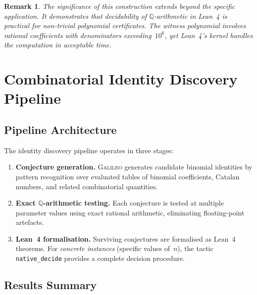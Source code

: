 \documentclass[11pt,a4paper]{article}
\newtheorem{remark}[theorem]{Remark}
\begin{document}
\begin{remark}
The significance of this construction extends beyond the specific application.
It demonstrates that \emph{decidability of $\mathbb{Q}$-arithmetic in Lean~4}
is practical for non-trivial polynomial certificates. The witness polynomial
involves rational coefficients with denominators exceeding~$10^{6}$, yet
Lean~4's kernel handles the computation in acceptable time.
\end{remark}

\section{Combinatorial Identity Discovery Pipeline}\label{sec:identities}

\subsection{Pipeline Architecture}

The identity discovery pipeline operates in three stages:
\begin{enumerate}
  \item \textbf{Conjecture generation.} \textsc{Galileo} generates candidate
    binomial identities by pattern recognition over evaluated tables of
    binomial coefficients, Catalan numbers, and related combinatorial
    quantities.
  \item \textbf{Exact $\mathbb{Q}$-arithmetic testing.} Each conjecture is
    tested at multiple parameter values using exact rational arithmetic,
    eliminating floating-point artefacts.
  \item \textbf{Lean~4 formalisation.} Surviving conjectures are formalised as
    Lean~4 theorems. For \emph{concrete instances} (specific values of~$n$),
    the tactic \texttt{native\_decide} provides a complete decision procedure.
\end{enumerate}

\subsection{Results Summary}
\end{document}
